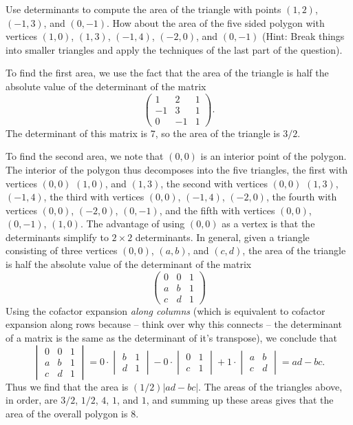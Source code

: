 \documentclass[12pt,a4paper]{article}
\theoremstyle{definition}
\begin{document}
\begin{question} Use determinants to compute the area of the triangle with points $(1,2)$, $(-1,3)$, and $(0,-1)$. How about the area of the five sided polygon with vertices $(1,0)$, $(1,3)$, $(-1,4)$, $(-2,0)$, and $(0,-1)$ (Hint: Break things into smaller triangles and apply the techniques of the last part of the question). \end{question}
\begin{solution}
	To find the first area, we use the fact that the area of the triangle is half the absolute value of the determinant of the matrix
	\[ \begin{pmatrix} 1 & 2 & 1 \\ -1 & 3 & 1 \\ 0 & -1 & 1 \end{pmatrix}. \]
	The determinant of this matrix is $7$, so the area of the triangle is $3/2$.

	To find the second area, we note that $(0,0)$ is an interior point of the polygon. The interior of the polygon thus decomposes into the five triangles, the first with vertices $(0,0)$ $(1,0)$, and $(1,3)$, the second with vertices $(0,0)$ $(1,3)$, $(-1,4)$, the third with vertices $(0,0)$, $(-1,4)$, $(-2,0)$, the fourth with vertices $(0,0)$, $(-2,0)$, $(0,-1)$, and the fifth with vertices $(0,0)$, $(0,-1)$, $(1,0)$. The advantage of using $(0,0)$ as a vertex is that the determinants simplify to $2 \times 2$ determinants. In general, given a triangle consisting of three vertices $(0,0)$, $(a,b)$, and $(c,d)$, the area of the triangle is half the absolute value of the determinant of the matrix
	\[ \begin{pmatrix} 0 & 0 & 1 \\ a & b & 1 \\ c & d & 1 \end{pmatrix} \]
	Using the cofactor expansion \emph{along columns} (which is equivalent to cofactor expansion along rows because -- think over why this connects -- the determinant of a matrix is the same as the determinant of it's transpose), we conclude that
	\[ \begin{vmatrix} 0 & 0 & 1 \\ a & b & 1 \\ c & d & 1 \end{vmatrix} = 0 \cdot \begin{vmatrix} b & 1 \\ d & 1 \end{vmatrix} - 0 \cdot \begin{vmatrix} 0 & 1 \\ c & 1 \end{vmatrix} + 1 \cdot \begin{vmatrix} a & b \\ c & d \end{vmatrix} = ad - bc. \]
	Thus we find that the area is $(1/2)|ad - bc|$. The areas of the triangles above, in order, are $3/2$, $1/2$, $4$, $1$, and $1$, and summing up these areas gives that the area of the overall polygon is $8$.
\end{solution}
\end{document}

